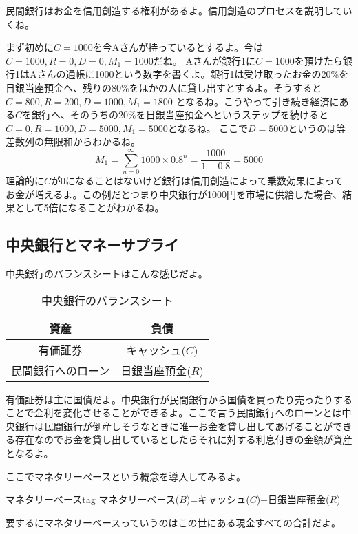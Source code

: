 \documentclass[a4paper, 12pt]{article}
\begin{document}
民間銀行はお金を信用創造する権利があるよ。信用創造のプロセスを説明していくね。

まず初めに$C=1000$を今Aさんが持っているとするよ。今は$C=1000, R=0, D=0, M_1=1000$だね。
Aさんが銀行1に$C=1000$を預けたら銀行1はAさんの通帳に1000という数字を書くよ。銀行1は受け取ったお金の20\%を日銀当座預金へ、残りの80\%をほかの人に貸し出すとするよ。そうすると$C=800, R=200, D=1000, M_1=1800$
となるね。こうやって引き続き経済にある$C$を銀行へ、そのうちの20\%を日銀当座預金へというステップを続けると$C=0,R=1000,D=5000,M_1=5000$となるね。
ここで$D=5000$というのは等差数列の無限和からわかるね。
\begin{equation*}
  M_1=\sum_{n=0}^{\infty}1000 \times 0.8^n=\frac{1000}{1-0.8}=5000
\end{equation*}
理論的に$C$が0になることはないけど銀行は信用創造によって乗数効果によってお金が増えるよ。この例だとつまり中央銀行が1000円を市場に供給した場合、結果として5倍になることがわかるね。
\subsection{中央銀行とマネーサプライ}
中央銀行のバランスシートはこんな感じだよ。
\begin{table}[h]
 \caption{中央銀行のバランスシート}
 \label{table:Balance Sheet}
 \centering
  \begin{tabular}{cc}
   \hline
   資産 & 負債 \\
   \hline
   有価証券 & キャッシュ($C$) \\
   民間銀行へのローン & 日銀当座預金($R$)  \\
   \hline
  \end{tabular}
\end{table}
有価証券は主に国債だよ。中央銀行が民間銀行から国債を買ったり売ったりすることで金利を変化させることができるよ。ここで言う民間銀行へのローンとは中央銀行は民間銀行が倒産しそうなときに唯一お金を貸し出してあげることができる存在なのでお金を貸し出しているとしたらそれに対する利息付きの金額が資産となるよ。

ここでマネタリーベースという概念を導入してみるよ。
\begin{definition1}{マネタリーベース}{tag}
  マネタリーベース($B$)=キャッシュ($C$)+日銀当座預金($R$)
\end{definition1}
要するにマネタリーベースっていうのはこの世にある現金すべての合計だよ。
\end{document}

